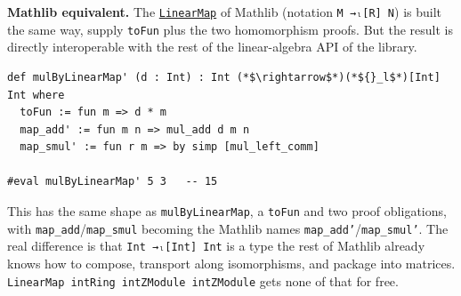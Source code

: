 \textbf{Mathlib equivalent.} The \href{https://loogle.lean-lang.org/?q=LinearMap}{\texttt{LinearMap}} of Mathlib (notation \texttt{M →ₗ[R] N}) is built the same way, supply \texttt{toFun} plus the two homomorphism proofs. But the result is directly interoperable with the rest of the linear-algebra API of the library.

\begin{lstlisting}
def mulByLinearMap' (d : Int) : Int (*$\rightarrow$*)(*${}_l$*)[Int] Int where
  toFun := fun m => d * m
  map_add' := fun m n => mul_add d m n
  map_smul' := fun r m => by simp [mul_left_comm]

#eval mulByLinearMap' 5 3   -- 15
\end{lstlisting}

This has the same shape as \texttt{mulByLinearMap}, a \texttt{toFun} and two proof obligations, with \texttt{map\_\allowbreak{}add}/\texttt{map\_\allowbreak{}smul} becoming the Mathlib names \texttt{map\_\allowbreak{}add'}/\texttt{map\_\allowbreak{}smul'}. The real difference is that \texttt{Int →ₗ[Int] Int} is a type the rest of Mathlib already knows how to compose, transport along isomorphisms, and package into matrices. \texttt{LinearMap intRing intZModule intZModule} gets none of that for free.
